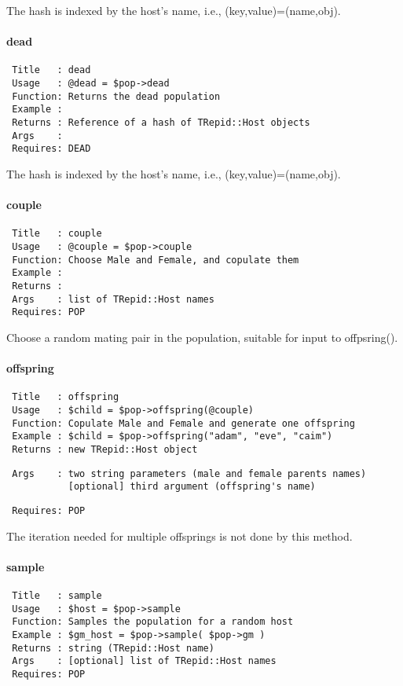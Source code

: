 The hash is indexed by the host's name, i.e., (key,value)=(name,obj).

\paragraph*{dead\label{dead}}
\begin{verbatim}
 Title   : dead
 Usage   : @dead = $pop->dead
 Function: Returns the dead population
 Example :
 Returns : Reference of a hash of TRepid::Host objects
 Args    :
 Requires: DEAD
\end{verbatim}


The hash is indexed by the host's name, i.e., (key,value)=(name,obj).

\paragraph*{couple\label{couple}}
\begin{verbatim}
 Title   : couple
 Usage   : @couple = $pop->couple
 Function: Choose Male and Female, and copulate them
 Example :
 Returns :
 Args    : list of TRepid::Host names
 Requires: POP
\end{verbatim}


Choose a random mating pair in the population, suitable for input to
offpsring().

\paragraph*{offspring\label{offspring}}
\begin{verbatim}
 Title   : offspring
 Usage   : $child = $pop->offspring(@couple)
 Function: Copulate Male and Female and generate one offspring
 Example : $child = $pop->offspring("adam", "eve", "caim")
 Returns : new TRepid::Host object
\end{verbatim}
\begin{verbatim}
 Args    : two string parameters (male and female parents names)
           [optional] third argument (offspring's name)
\end{verbatim}
\begin{verbatim}
 Requires: POP
\end{verbatim}


The iteration needed for multiple offsprings is not done by this method.

\paragraph*{sample\label{sample}}
\begin{verbatim}
 Title   : sample
 Usage   : $host = $pop->sample
 Function: Samples the population for a random host
 Example : $gm_host = $pop->sample( $pop->gm )
 Returns : string (TRepid::Host name)
 Args    : [optional] list of TRepid::Host names
 Requires: POP
\end{verbatim}
